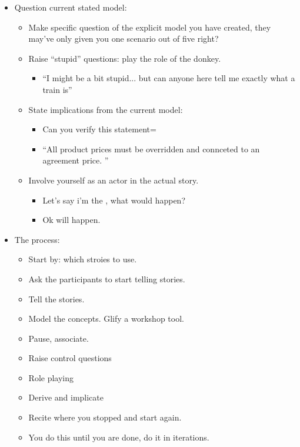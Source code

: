 \begin{itemize}
    \item Question current stated model: 
        \begin{itemize}
            \item Make specific question of the explicit model you have created, they may've only given you one scenario out of five right? 
            \item Raise ``stupid'' questions: play the role of the donkey. 
                \begin{itemize}
                    \item ``I might be a bit stupid... but can anyone here tell me exactly what a train is''
                \end{itemize}
            
            \item State implications from the current model:
                \begin{itemize}
                    \item Can you verify this statement= 
                    \item ``All product prices must be overridden and connceted to an agreement price. '' 
                \end{itemize}
            
            \item Involve yourself as an actor in the actual story.
                \begin{itemize}
                    \item Let's say i'm the , what would happen?  
                    \item Ok  will happen.  
                \end{itemize}
        \end{itemize}
    
    \item The process:
        \begin{itemize}
            \item Start by: which stroies to use.
            \item Ask the participants to start telling stories. 
            \item Tell the stories. 
            \item Model the concepts. Glify a workshop tool.  
            \item Pause, associate.
            \item Raise control questions 
            \item Role playing 
            \item Derive and implicate 
            \item Recite where you stopped and start again. 
            \item You do this until you are done, do it in iterations. 
        \end{itemize}
\end{itemize}


